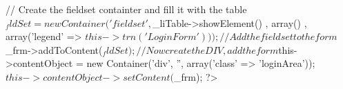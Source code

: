 \begin{DoxyCodeInclude}
{{                // Create the fieldset containter and fill it with the table
                $_fldSet = new Container(
                          'fieldset'
                        , $_liTable->showElement()
                        , array()
                        , array('legend' => $this->trn('Login Form'))
                );

                // Add the fieldset to the form
                $_frm->addToContent($_fldSet);

                // Now create the DIV, add the form 
                $this->contentObject = new Container('div', '', array('class' => 
      'loginArea'));
                $this->contentObject->setContent($_frm);
        }
}
?>
\end{DoxyCodeInclude}
 